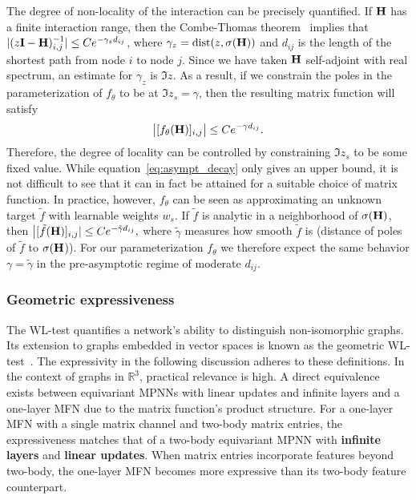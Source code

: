 \documentclass{article} \usepackage{iclr2024_conference,times}
\def\eqref#1{equation~\ref{#1}}
\newcommand{\R}{\mathbb{R}}
\def\R{\mathbb{R}}
\begin{document}
The degree of non-locality of the interaction can be precisely quantified. If ${\bf H}$ has a finite interaction range, then the Combe-Thomas theorem~\cite{Combes1973} implies that
$|(z{\bf I}-{\bf H})^{-1}_{i, j} | \leq C e^{- \gamma_z d_{ij}}$, where $\gamma_z = {\rm dist}(z, \sigma({\bf H}))$ and $d_{ij}$ is the length of the shortest path from node $i$ to node $j$. Since we have taken ${\bf H}$ self-adjoint with real spectrum, an estimate for $\gamma_z$ is $\Im z$. As a result, if we constrain the poles in the parameterization of $f_\theta$ to be at $\Im z_s = \gamma$, then the resulting matrix function will satisfy 
\begin{equation} \label{eq:asympt_decay}
    \big| [ f_\theta({\bf H}) ]_{i,j} \big| \leq C e^{-\gamma d_{ij}}.
\end{equation}
Therefore, the degree of locality can be controlled by constraining $\Im z_s$ to be some fixed value. 
While \eqref{eq:asympt_decay} only gives an upper bound, it is not difficult to see that it can in fact be attained for a suitable choice of matrix function. 
In practice, however, $f_\theta$ can be seen as approximating an unknown target $\tilde{f}$ with learnable weights $w_s$. If $\tilde{f}$ is analytic in a neighborhood of $\sigma({\bf H})$, then $ \big|[ \tilde{f}({\bf H})]_{i,j}| \leq C e^{-\tilde{\gamma} d_{ij}},$ where $\tilde{\gamma}$ measures how smooth $\tilde{f}$ is (distance of poles of $\tilde{f}$ to $\sigma{(\bf H}$)). For our parameterization $f_\theta$ we therefore expect the same behavior $\gamma = \tilde{\gamma}$ in the pre-asymptotic regime of moderate $d_{ij}$. 

\vspace{-6pt}
\subsubsection*{Geometric expressiveness}
\vspace{-5pt}
The WL-test quantifies a network's ability to distinguish non-isomorphic graphs. Its extension to graphs embedded in vector spaces is known as the geometric WL-test~\citep{joshi2023expressive}. The expressivity in the following discussion adheres to these definitions.
In the context of graphs in $\R^3$, practical relevance is high. A direct equivalence exists between equivariant MPNNs with linear updates and infinite layers and a one-layer MFN due to the matrix function's product structure.
For a one-layer MFN with a single matrix channel and two-body matrix entries, the expressiveness matches that of a two-body equivariant MPNN with \textbf{infinite layers} and \textbf{linear updates}. When matrix entries incorporate features beyond two-body, the one-layer MFN becomes more expressive than its two-body feature counterpart.
\end{document}
